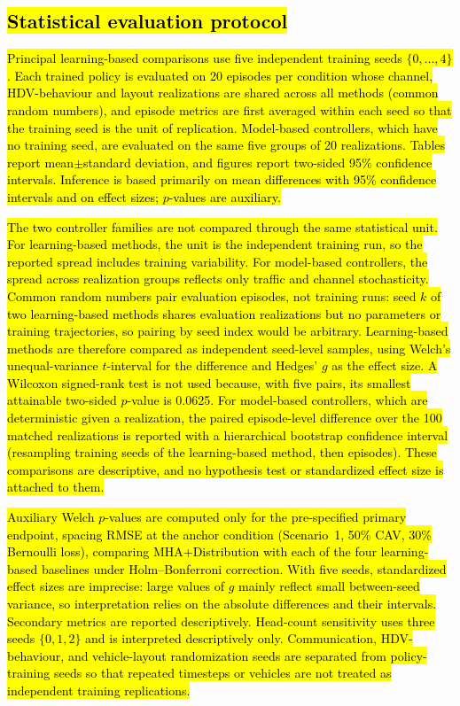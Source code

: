 \documentclass{ieeeaccess}
\begin{document}
\subsection{\hl{Statistical evaluation protocol}}
\label{sec:statistical_protocol}

\hl{Principal learning-based comparisons use five independent training seeds $\{0,\ldots,4\}$. Each trained policy is evaluated on 20 episodes per condition whose channel, HDV-behaviour and layout realizations are shared across all methods (common random numbers), and episode metrics are first averaged within each seed so that the training seed is the unit of replication. Model-based controllers, which have no training seed, are evaluated on the same five groups of 20 realizations. Tables report mean$\pm$standard deviation, and figures report two-sided 95\% confidence intervals. Inference is based primarily on mean differences with 95\% confidence intervals and on effect sizes; $p$-values are auxiliary.} %

\hl{The two controller families are not compared through the same statistical unit. For learning-based methods, the unit is the independent training run, so the reported spread includes training variability. For model-based controllers, the spread across realization groups reflects only traffic and channel stochasticity. Common random numbers pair evaluation episodes, not training runs: seed $k$ of two learning-based methods shares evaluation realizations but no parameters or training trajectories, so pairing by seed index would be arbitrary. Learning-based methods are therefore compared as independent seed-level samples, using Welch's unequal-variance $t$-interval for the difference and Hedges' $g$ as the effect size. A Wilcoxon signed-rank test is not used because, with five pairs, its smallest attainable two-sided $p$-value is 0.0625. For model-based controllers, which are deterministic given a realization, the paired episode-level difference over the 100 matched realizations is reported with a hierarchical bootstrap confidence interval (resampling training seeds of the learning-based method, then episodes). These comparisons are descriptive, and no hypothesis test or standardized effect size is attached to them.} %

\hl{Auxiliary Welch $p$-values are computed only for the pre-specified primary endpoint, spacing RMSE at the anchor condition (Scenario~1, 50\% CAV, 30\% Bernoulli loss), comparing MHA+Distribution with each of the four learning-based baselines under Holm--Bonferroni correction. With five seeds, standardized effect sizes are imprecise: large values of $g$ mainly reflect small between-seed variance, so interpretation relies on the absolute differences and their intervals. Secondary metrics are reported descriptively. Head-count sensitivity uses three seeds $\{0,1,2\}$ and is interpreted descriptively only. Communication, HDV-behaviour, and vehicle-layout randomization seeds are separated from policy-training seeds so that repeated timesteps or vehicles are not treated as independent training replications.} %
\end{document}
